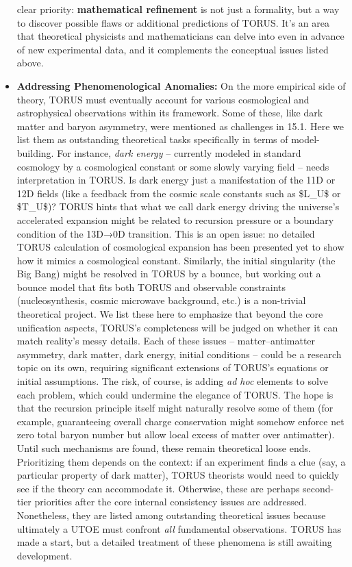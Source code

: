 \begin{itemize}
  clear priority: \textbf{mathematical refinement} is not just a
  formality, but a way to discover possible flaws or additional
  predictions of TORUS. It's an area that theoretical physicists and
  mathematicians can delve into even in advance of new experimental
  data, and it complements the conceptual issues listed above.
\item
  \textbf{Addressing Phenomenological Anomalies:} On the more empirical
  side of theory, TORUS must eventually account for various cosmological
  and astrophysical observations within its framework. Some of these,
  like dark matter and baryon asymmetry, were mentioned as challenges in
  15.1. Here we list them as outstanding theoretical tasks specifically
  in terms of model-building. For instance, \emph{dark energy} --
  currently modeled in standard cosmology by a cosmological constant or
  some slowly varying field -- needs interpretation in TORUS. Is dark
  energy just a manifestation of the 11D or 12D fields (like a feedback
  from the cosmic scale constants such as \$L\_U\$ or \$T\_U\$)? TORUS
  hints that what we call dark energy driving the universe's accelerated
  expansion might be related to recursion pressure or a boundary
  condition of the 13D→0D transition. This is an open issue: no detailed
  TORUS calculation of cosmological expansion has been presented yet to
  show how it mimics a cosmological constant. Similarly, the initial
  singularity (the Big Bang) might be resolved in TORUS by a bounce, but
  working out a bounce model that fits both TORUS and observable
  constraints (nucleosynthesis, cosmic microwave background, etc.) is a
  non-trivial theoretical project. We list these here to emphasize that
  beyond the core unification aspects, TORUS's completeness will be
  judged on whether it can match reality's messy details. Each of these
  issues -- matter--antimatter asymmetry, dark matter, dark energy,
  initial conditions -- could be a research topic on its own, requiring
  significant extensions of TORUS's equations or initial assumptions.
  The risk, of course, is adding \emph{ad hoc} elements to solve each
  problem, which could undermine the elegance of TORUS. The hope is that
  the recursion principle itself might naturally resolve some of them
  (for example, guaranteeing overall charge conservation might somehow
  enforce net zero total baryon number but allow local excess of matter
  over antimatter). Until such mechanisms are found, these remain
  theoretical loose ends. Prioritizing them depends on the context: if
  an experiment finds a clue (say, a particular property of dark
  matter), TORUS theorists would need to quickly see if the theory can
  accommodate it. Otherwise, these are perhaps second-tier priorities
  after the core internal consistency issues are addressed. Nonetheless,
  they are listed among outstanding theoretical issues because
  ultimately a UTOE must confront \emph{all} fundamental observations.
  TORUS has made a start, but a detailed treatment of these phenomena is
  still awaiting development.
\end{itemize}

